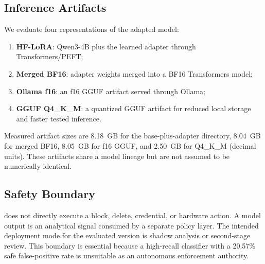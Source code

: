 \subsection{Inference Artifacts}
We evaluate four representations of the adapted model:
\begin{enumerate}
    \item \textbf{HF-LoRA}: Qwen3-4B plus the learned adapter through Transformers/PEFT;
    \item \textbf{Merged BF16}: adapter weights merged into a BF16 Transformers model;
    \item \textbf{Ollama f16}: an f16 GGUF artifact served through Ollama;
    \item \textbf{GGUF Q4\_K\_M}: a quantized GGUF artifact for reduced local storage and faster tested inference.
\end{enumerate}
Measured artifact sizes are 8.18~GB for the base-plus-adapter directory, 8.04~GB for merged BF16, 8.05~GB for f16 GGUF, and 2.50~GB for Q4\_K\_M (decimal units). These artifacts share a model lineage but are not assumed to be numerically identical.

\subsection{Safety Boundary}
\model{} does not directly execute a block, delete, credential, or hardware action. A model output is an analytical signal consumed by a separate policy layer. The intended deployment mode for the evaluated version is shadow analysis or second-stage review. This boundary is essential because a high-recall classifier with a 20.57\% safe false-positive rate is unsuitable as an autonomous enforcement authority.
